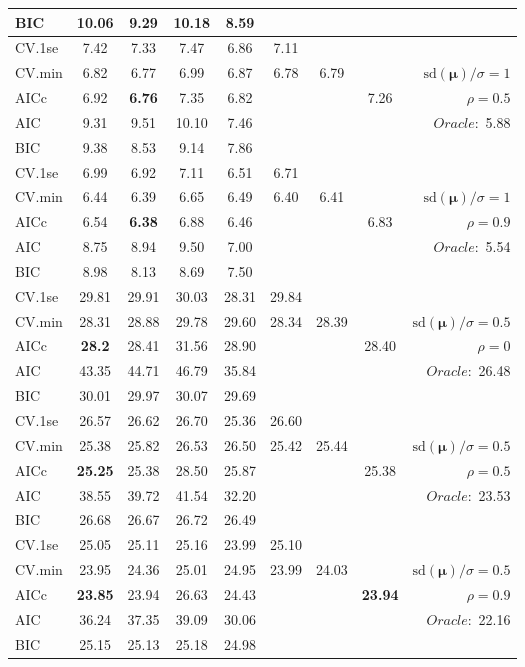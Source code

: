 \begin{table}
\begin{center}
\begin{tabular}{l*{7}{c}|r}
BIC & 10.06 & 9.29 & 10.18 & 8.59 & & & &  \\
 \hline 
CV.1se & 7.42 & 7.33 & 7.47 & 6.86 & 7.11 & & & \\
CV.min & 6.82 & 6.77 & 6.99 & 6.87 & 6.78 & 6.79 & & $\mathrm{sd}(\mathbf{\mu})/\sigma=1$ \\
AICc & 6.92 & {\bf 6.76} & 7.35 & 6.82 & & & 7.26 &  $\rho=0.5$ \\
AIC & 9.31 & 9.51 & 10.10 & 7.46 & & & &  \multirow{2}{*}{$Oracle: $ 5.88} \\
BIC & 9.38 & 8.53 & 9.14 & 7.86 & & & &  \\
 \hline 
CV.1se & 6.99 & 6.92 & 7.11 & 6.51 & 6.71 & & & \\
CV.min & 6.44 & 6.39 & 6.65 & 6.49 & 6.40 & 6.41 & & $\mathrm{sd}(\mathbf{\mu})/\sigma=1$ \\
AICc & 6.54 & {\bf 6.38} & 6.88 & 6.46 & & & 6.83 &  $\rho=0.9$ \\
AIC & 8.75 & 8.94 & 9.50 & 7.00 & & & &  \multirow{2}{*}{$Oracle: $ 5.54} \\
BIC & 8.98 & 8.13 & 8.69 & 7.50 & & & &  \\
 \hline 
CV.1se & 29.81 & 29.91 & 30.03 & 28.31 & 29.84 & & & \\
CV.min & 28.31 & 28.88 & 29.78 & 29.60 & 28.34 & 28.39 & & $\mathrm{sd}(\mathbf{\mu})/\sigma=0.5$ \\
AICc & {\bf 28.2} & 28.41 & 31.56 & 28.90 & & & 28.40 &  $\rho=0$ \\
AIC & 43.35 & 44.71 & 46.79 & 35.84 & & & &  \multirow{2}{*}{$Oracle: $ 26.48} \\
BIC & 30.01 & 29.97 & 30.07 & 29.69 & & & &  \\
 \hline 
CV.1se & 26.57 & 26.62 & 26.70 & 25.36 & 26.60 & & & \\
CV.min & 25.38 & 25.82 & 26.53 & 26.50 & 25.42 & 25.44 & & $\mathrm{sd}(\mathbf{\mu})/\sigma=0.5$ \\
AICc & {\bf 25.25} & 25.38 & 28.50 & 25.87 & & & 25.38 &  $\rho=0.5$ \\
AIC & 38.55 & 39.72 & 41.54 & 32.20 & & & &  \multirow{2}{*}{$Oracle: $ 23.53} \\
BIC & 26.68 & 26.67 & 26.72 & 26.49 & & & &  \\
 \hline 
CV.1se & 25.05 & 25.11 & 25.16 & 23.99 & 25.10 & & & \\
CV.min & 23.95 & 24.36 & 25.01 & 24.95 & 23.99 & 24.03 & & $\mathrm{sd}(\mathbf{\mu})/\sigma=0.5$ \\
AICc & {\bf 23.85} & 23.94 & 26.63 & 24.43 & & & {\bf 23.94} &  $\rho=0.9$ \\
AIC & 36.24 & 37.35 & 39.09 & 30.06 & & & &  \multirow{2}{*}{$Oracle: $ 22.16} \\
BIC & 25.15 & 25.13 & 25.18 & 24.98 & & & &  \\
 \hline 
\end{tabular}
\end{center}
\vspace{-1cm}
\end{table}





